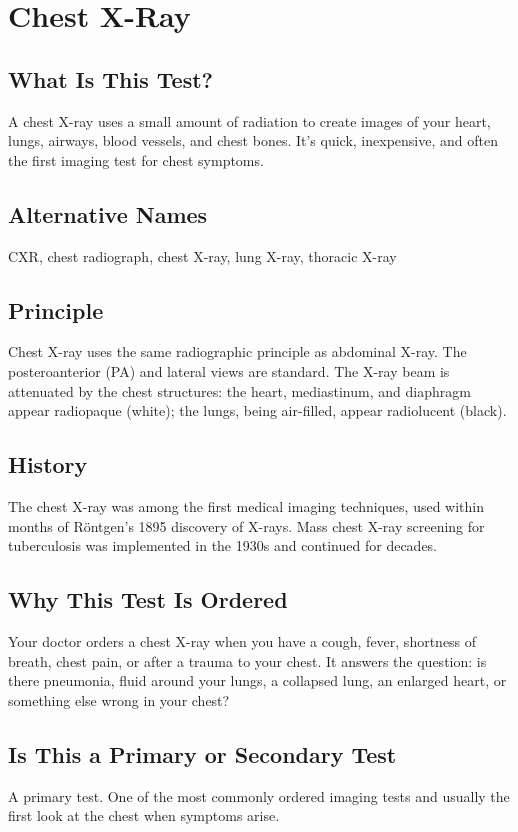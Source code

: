 \chapter{Chest X-Ray}

\section*{What Is This Test?}
A chest X-ray uses a small amount of radiation to create images of your heart, lungs, airways, blood vessels, and chest bones. It's quick, inexpensive, and often the first imaging test for chest symptoms.

\section*{Alternative Names}
CXR, chest radiograph, chest X-ray, lung X-ray, thoracic X-ray


\section*{Principle}
Chest X-ray uses the same radiographic principle as abdominal X-ray. The posteroanterior (PA) and lateral views are standard. The X-ray beam is attenuated by the chest structures: the heart, mediastinum, and diaphragm appear radiopaque (white); the lungs, being air-filled, appear radiolucent (black).

\section*{History}
The chest X-ray was among the first medical imaging techniques, used within months of Röntgen's 1895 discovery of X-rays. Mass chest X-ray screening for tuberculosis was implemented in the 1930s and continued for decades.

\section*{Why This Test Is Ordered}
Your doctor orders a chest X-ray when you have a cough, fever, shortness of breath, chest pain, or after a trauma to your chest. It answers the question: is there pneumonia, fluid around your lungs, a collapsed lung, an enlarged heart, or something else wrong in your chest?

\section*{Is This a Primary or Secondary Test}
A primary test. One of the most commonly ordered imaging tests and usually the first look at the chest when symptoms arise.

